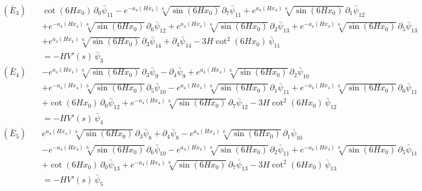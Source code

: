 \begin{align*}
(\bar E_{3})\quad & \cot \left(6 H x_0\right)\,\partial_{0}\bar\psi_{11} - e^{-a_4\left(H x_4\right)} \sqrt[6]{\sin \left(6 H x_0\right)}\,\partial_{7}\bar\psi_{11} + e^{a_4\left(H x_4\right)} \sqrt[6]{\sin \left(6 H x_0\right)}\,\partial_{1}\bar\psi_{12} \\
 &  + e^{-a_4\left(H x_4\right)} \sqrt[6]{\sin \left(6 H x_0\right)}\,\partial_{6}\bar\psi_{12} + e^{a_4\left(H x_4\right)} \sqrt[6]{\sin \left(6 H x_0\right)}\,\partial_{2}\bar\psi_{13} + e^{-a_4\left(H x_4\right)} \sqrt[6]{\sin \left(6 H x_0\right)}\,\partial_{5}\bar\psi_{13} \\
 &  + e^{a_4\left(H x_4\right)} \sqrt[6]{\sin \left(6 H x_0\right)}\,\partial_{3}\bar\psi_{14} + \partial_{4}\bar\psi_{14} - 3 H \cot ^2\left(6 H x_0\right)\,\bar\psi_{11} \\
 & = -H V'(s)\,\bar\psi_{3}
\end{align*}
\begin{align*}
(\bar E_{4})\quad & -e^{a_4\left(H x_4\right)} \sqrt[6]{\sin \left(6 H x_0\right)}\,\partial_{3}\bar\psi_{9} - \partial_{4}\bar\psi_{9} + e^{a_4\left(H x_4\right)} \sqrt[6]{\sin \left(6 H x_0\right)}\,\partial_{2}\bar\psi_{10} \\
 &  + e^{-a_4\left(H x_4\right)} \sqrt[6]{\sin \left(6 H x_0\right)}\,\partial_{5}\bar\psi_{10} - e^{a_4\left(H x_4\right)} \sqrt[6]{\sin \left(6 H x_0\right)}\,\partial_{1}\bar\psi_{11} + e^{-a_4\left(H x_4\right)} \sqrt[6]{\sin \left(6 H x_0\right)}\,\partial_{6}\bar\psi_{11} \\
 &  + \cot \left(6 H x_0\right)\,\partial_{0}\bar\psi_{12} + e^{-a_4\left(H x_4\right)} \sqrt[6]{\sin \left(6 H x_0\right)}\,\partial_{7}\bar\psi_{12} - 3 H \cot ^2\left(6 H x_0\right)\,\bar\psi_{12} \\
 & = -H V'(s)\,\bar\psi_{4}
\end{align*}
\begin{align*}
(\bar E_{5})\quad & e^{a_4\left(H x_4\right)} \sqrt[6]{\sin \left(6 H x_0\right)}\,\partial_{3}\bar\psi_{8} + \partial_{4}\bar\psi_{8} - e^{a_4\left(H x_4\right)} \sqrt[6]{\sin \left(6 H x_0\right)}\,\partial_{1}\bar\psi_{10} \\
 &  - e^{-a_4\left(H x_4\right)} \sqrt[6]{\sin \left(6 H x_0\right)}\,\partial_{6}\bar\psi_{10} - e^{a_4\left(H x_4\right)} \sqrt[6]{\sin \left(6 H x_0\right)}\,\partial_{2}\bar\psi_{11} + e^{-a_4\left(H x_4\right)} \sqrt[6]{\sin \left(6 H x_0\right)}\,\partial_{5}\bar\psi_{11} \\
 &  + \cot \left(6 H x_0\right)\,\partial_{0}\bar\psi_{13} + e^{-a_4\left(H x_4\right)} \sqrt[6]{\sin \left(6 H x_0\right)}\,\partial_{7}\bar\psi_{13} - 3 H \cot ^2\left(6 H x_0\right)\,\bar\psi_{13} \\
 & = -H V'(s)\,\bar\psi_{5}
\end{align*}
